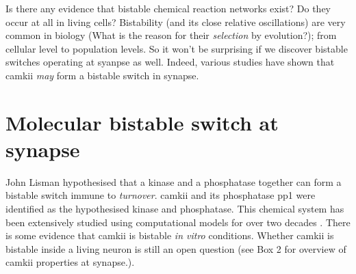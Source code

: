 \documentclass[]{resonance}
\begin{document}
Is there any evidence that bistable chemical reaction networks exist? Do they
occur at all in living cells?  Bistability (and its close relative oscillations)
are very common in biology (What is the reason for their \emph{selection}
by evolution?); from cellular level to population levels. So it
won't be surprising if we discover bistable switches operating at syanpse as
well. Indeed, various studies have shown that \gls{camkii} \emph{may} form a
bistable switch in synapse.

\section{Molecular bistable switch at synapse}\label{sec:molecular_switch}

John Lisman hypothesised that a kinase and a phosphatase together can form a
bistable switch immune to \emph{turnover}. \gls{camkii} and its phosphatase
\Gls{pp1} were identified as the hypothesised kinase and phosphatase. This
chemical system has been extensively studied using computational models for over
two decades \cite{sandstorm}. There is some evidence that \gls{camkii} is
bistable \emph{in vitro} conditions. Whether \gls{camkii} is bistable
inside a living neuron is still an open question (see Box 2 for overview of
\gls{camkii} properties at synapse.).
\end{document}
